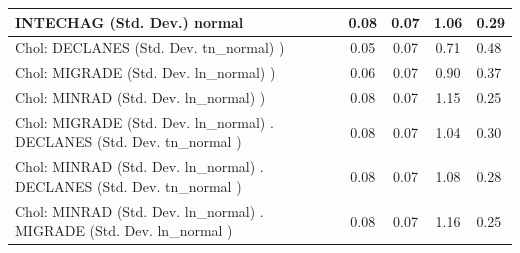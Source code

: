 \begin{table}
\begin{center}
\begin{tabular}{|l|l|c|c|c|l|}
			\hline
			INTECHAG (Std. Dev.) normal &  & 0.08 & 0.07 & 1.06 & 0.29 \\
			\hline
			 Chol: DECLANES (Std. Dev. tn_normal) ) &  & 0.05 & 0.07 & 0.71 & 0.48 \\
			\hline
			 Chol: MIGRADE (Std. Dev. ln_normal) ) &  & 0.06 & 0.07 & 0.90 & 0.37 \\
			\hline
			 Chol: MINRAD (Std. Dev. ln_normal) ) &  & 0.08 & 0.07 & 1.15 & 0.25 \\
			\hline
			 Chol: MIGRADE (Std. Dev. ln_normal) . DECLANES (Std. Dev.   tn_normal ) &  & 0.08 & 0.07 & 1.04 & 0.30 \\
			\hline
			 Chol: MINRAD (Std. Dev. ln_normal) . DECLANES (Std. Dev.   tn_normal ) &  & 0.08 & 0.07 & 1.08 & 0.28 \\
			\hline
			 Chol: MINRAD (Std. Dev. ln_normal) . MIGRADE (Std. Dev.   ln_normal ) &  & 0.08 & 0.07 & 1.16 & 0.25 \\
			\hline
		\end{tabular}
	\end{center}
\end{table}